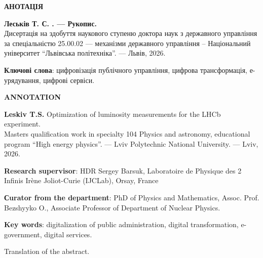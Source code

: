 \begin{center}
{\large \textbf{АНОТАЦІЯ}}
\end{center}

\textbf{Леськів Т. С. \thesistopic. --– Рукопис.}  \\
Дисертація на здобуття наукового ступеню доктора наук з державного управління за спеціальністю 25.00.02 --– механізми державного управління – Національний університет \foreignquote{ukrainian}{Львівська політехніка}. --– Львів, 2026.

\textbf{Ключові слова}: цифровізація публічного управління, цифрова трансформація, е-урядування, цифрові сервіси.

\bigskip

\clearpage

\begin{center}
{\large \textbf{ANNOTATION}}
\end{center}

\textbf{Leskiv T.S.} Optimization of luminosity measurements for the LHCb experiment. \\
Masters qualification work in specialty 104 Physics and astronomy, educational program \foreignquote{ukrainian}{High energy physics}. --- Lviv Polytechnic National University. --- Lviv, 2026.

\textbf{Research supervisor}: HDR Sergey Barsuk, Laboratoire de Physique des 2 Infinis Ir\`{e}ne Joliot-Curie (IJCLab), Orsay, France

\textbf{Сurator from the department}: PhD of Physics and Mathematics, Assoc. Prof. Bezshyyko O., Associate Professor of Department of Nuclear Physics.

\textbf{Key words}: digitalization of public administration, digital transformation, e-government, digital services.

Translation of the abstract.
